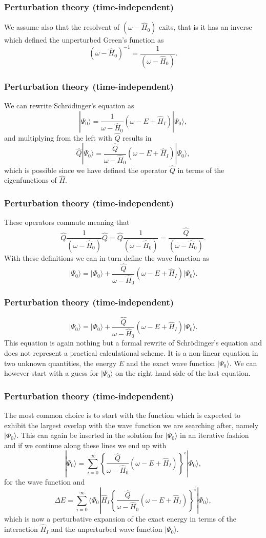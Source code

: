\documentclass[compress]{beamer}
\begin{document}
\frame
{
\frametitle{Perturbation theory (time-independent)}
\begin{small}
{\scriptsize
We assume also that the resolvent of $\left(\omega-\hat{H}_0\right)$ exits, that is
it has an inverse which defined the unperturbed Green's function as
\[
\left(\omega-\hat{H}_0\right)^{-1}=\frac{1}{\left(\omega-\hat{H}_0\right)}.
\]

}
\end{small}
}


\frame
{
\frametitle{Perturbation theory (time-independent)}
\begin{small}
{\scriptsize
We can rewrite Schr\"odinger's equation as
\[
|\Psi_0\rangle=\frac{1}{\omega-\hat{H}_0}\left(\omega-E+\hat{H}_I\right)|\Psi_0\rangle,
\]
and multiplying from the left with $\hat{Q}$ results in
\[
\hat{Q}|\Psi_0\rangle=\frac{\hat{Q}}{\omega-\hat{H}_0}\left(\omega-E+\hat{H}_I\right)|\Psi_0\rangle,
\]
which is possible since we have defined the operator $\hat{Q}$ in terms of the eigenfunctions of $\hat{H}$.
}
\end{small}
}


\frame
{
\frametitle{Perturbation theory (time-independent)}
\begin{small}
{\scriptsize
 These operators commute meaning that
\[
\hat{Q}\frac{1}{\left(\omega-\hat{H}_0\right)}\hat{Q}=\hat{Q}\frac{1}{\left(\omega-\hat{H}_0\right)}=\frac{\hat{Q}}{\left(\omega-\hat{H}_0\right)}.
\]
With these definitions we can in turn define the wave function as 
\[
|\Psi_0\rangle=|\Phi_0\rangle+\frac{\hat{Q}}{\omega-\hat{H}_0}\left(\omega-E+\hat{H}_I\right)|\Psi_0\rangle.
\]
}
\end{small}
}


\frame
{
\frametitle{Perturbation theory (time-independent)}
\begin{small}
{\scriptsize
\[
|\Psi_0\rangle=|\Phi_0\rangle+\frac{\hat{Q}}{\omega-\hat{H}_0}\left(\omega-E+\hat{H}_I\right)|\Psi_0\rangle.
\]
This equation is again nothing but a formal rewrite of Schr\"odinger's equation
and does not represent a practical calculational scheme.  
It is a non-linear equation in two unknown quantities, the energy $E$ and the exact
wave function $|\Psi_0\rangle$. We can however start with a guess for $|\Psi_0\rangle$ on the right hand side of the last equation.
}
\end{small}
}
\frame
{
\frametitle{Perturbation theory (time-independent)}
\begin{small}
{\scriptsize
 The most common choice is to start with the function which is expected to exhibit the largest overlap with the wave function we are searching after, namely $|\Phi_0\rangle$. This can again be inserted in the solution for $|\Psi_0\rangle$ in an iterative fashion and if we continue along these lines we end up with
\[
|\Psi_0\rangle=\sum_{i=0}^{\infty}\left\{\frac{\hat{Q}}{\omega-\hat{H}_0}\left(\omega-E+\hat{H}_I\right)\right\}^i|\Phi_0\rangle, 
\]
for the wave function and
\[
\Delta E=\sum_{i=0}^{\infty}\langle \Phi_0|\hat{H}_I\left\{\frac{\hat{Q}}{\omega-\hat{H}_0}\left(\omega-E+\hat{H}_I\right)\right\}^i|\Phi_0\rangle, 
\]
which is now  a perturbative expansion of the exact energy in terms of the interaction
$\hat{H}_I$ and the unperturbed wave function $|\Psi_0\rangle$.
}
\end{small}
}
\end{document}
